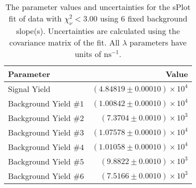 
\begin{table}
    \begin{center}
        \begin{tabular}{lr}\toprule
            Parameter & Value \\\midrule
            Signal Yield & $(4.84819 \pm 0.00010) \times 10^{4}$ \\
            Background Yield $\#1$ & $(1.00842 \pm 0.00010) \times 10^{4}$ \\
            Background Yield $\#2$ & $(7.3704 \pm 0.0010) \times 10^{3}$ \\
            Background Yield $\#3$ & $(1.07578 \pm 0.00010) \times 10^{4}$ \\
            Background Yield $\#4$ & $(1.01058 \pm 0.00010) \times 10^{4}$ \\
            Background Yield $\#5$ & $(9.8822 \pm 0.0010) \times 10^{3}$ \\
            Background Yield $\#6$ & $(7.5166 \pm 0.0010) \times 10^{3}$ \\\bottomrule
        \end{tabular}
        \caption{The parameter values and uncertainties for the sPlot fit of data with $\chi^2_\nu < 3.00$ using 6 fixed background slope(s). Uncertainties are calculated using the covariance matrix of the fit. All $\lambda$ parameters have units of $\si{\nano\second}^{-1}$.}
    \end{center}
\end{table}
